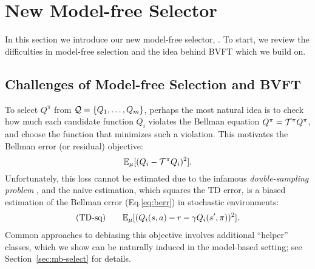 %

\section{New Model-free Selector} \label{sec:mf-select}


In this section we introduce our new model-free selector, \lstd. To start, we review the difficulties in model-free selection and the idea behind BVFT \cite{xie2020batch, zhang2021towards} which we build on. %

\subsection{Challenges of Model-free Selection and BVFT}
To select $Q^\pi$ from $\mathcal{Q}=\{Q_1, \ldots, Q_m\}$, perhaps the most natural idea is to check how much each candidate function $Q_i$ violates the Bellman equation $Q^\pi = \mathcal{T}^\pi Q^\pi$, and choose the function that minimizes such a violation. This motivates the Bellman error (or residual) objective:
\begin{equation}\label{eq:berr}
    \mathbb{E}_{\mu}[(Q_i - \mathcal{T}^\pi Q_i)^2].
\end{equation}
Unfortunately, this loss cannot be estimated due to the infamous \textit{double-sampling problem} \cite{baird1995residual, sutton2018reinforcement, chen2019information}, and the na\"ive estimation, which squares the TD error, is a biased estimation of the Bellman error (Eq.\eqref{eq:berr}) in stochastic environments:
\begin{align} \label{eq:td-sq}
\textrm{(TD-sq)} \qquad \mathbb{E}_{\mu}[(Q_i(s,a) - r - \gamma Q_i(s',\pi))^2].
\end{align} 
Common approaches to debiasing this objective involves additional ``helper'' classes, which we show can be naturally induced in the model-based setting; see Section~\ref{sec:mb-select} for details. 

